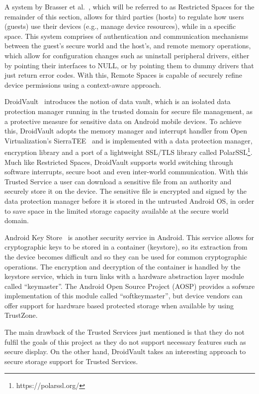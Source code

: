 A system by Brasser et al.~\cite{brasserregulating}, which will be referred to as Restricted Spaces for the remainder of this section, allows for third parties (hosts) to regulate how users (guests) use their devices (e.g., manage device resources), while in a specific space. This system comprises of authentication and communication mechanisms between the guest's secure world and the host's, and remote memory operations, which allow for configuration changes such as uninstall peripheral drivers, either by pointing their interfaces to NULL, or by pointing them to dummy drivers that just return error codes. With this, Remote Spaces is capable of securely refine device permissions using a context-aware approach.

DroidVault~\cite{li2014droidvault} introduces the notion of data vault, which is an isolated data protection manager running in the trusted domain for secure file management, as a protective measure for sensitive data on Android mobile devices. To achieve this, DroidVault adopts the memory manager and interrupt handler from Open Virtualization's SierraTEE~\cite{sierra_tee} and is implemented with a data protection manager, encryption library and a port of a lightweight SSL/TLS library called PolarSSL\footnote{https://polarssl.org/}. Much like Restricted Spaces, DroidVault supports world switching through software interrupts, secure boot and even inter-world communication. With this Trusted Service a user can download a sensitive file from an authority and securely store it on the device. The sensitive file is encrypted and signed by the data protection manager before it is stored in the untrusted Android OS, in order to save space in the limited storage capacity available at the secure world domain.

Android Key Store~\cite{aks} is another security service in Android. This service allows for cryptographic keys to be stored in a container (keystore), so its extraction from the device becomes difficult and so they can be used for common cryptographic operations. The encryption and decryption of the container is handled by the keystore service, which in turn links with a hardware abstraction layer module called ``keymaster''. The Android Open Source Project (AOSP) provides a sofware implementation of this module called ``softkeymaster'', but device vendors can offer support for hardware based protected storage when available by using TrustZone.

The main drawback of the Trusted Services just mentioned is that they do not fulfil the goals of this project as they do not support necessary features such as secure display. On the other hand, DroidVault takes an interesting approach to secure storage support for Trusted Services.

